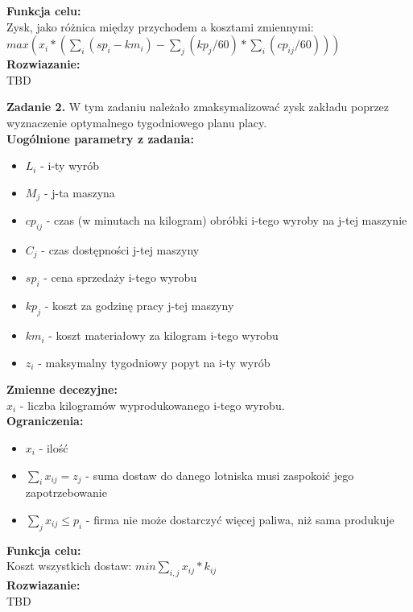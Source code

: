 \documentclass[15pt, a4paper]{article}
\begin{document}
\noindent\textbf{Funkcja celu:}\\

Zysk, jako różnica między przychodem a kosztami zmiennymi:\\ \(max( x_{i} * ( \sum_{i}( sp_i - km_{i} ) - \sum_{j}(kp_j / 60) * \sum_{i}(cp_{ij} / 60)  ))\)\\

\noindent\textbf{Rozwiazanie:}\\ 

TBD

\vspace{0.5cm}

\noindent\hrulefill

\vspace{0.5cm}


\noindent\textbf{Zadanie 2.} W tym zadaniu należało zmaksymalizować zysk zakładu poprzez wyznaczenie optymalnego tygodniowego planu placy.\\

\noindent\textbf{Uogólnione parametry z zadania:}

\begin{itemize}
    \item \( L_i \) - i-ty wyrób
    \item \( M_j \) - j-ta maszyna
    \item \( cp_{ij} \) - czas (w minutach na kilogram) obróbki i-tego wyroby na j-tej maszynie
    \item \( C_j \) - czas dostępności j-tej maszyny
    \item \( sp_i \) - cena sprzedaży i-tego wyrobu
    \item \( kp_j \) - koszt za godzinę pracy j-tej maszyny
    \item \( km_{i} \) - koszt materiałowy za kilogram i-tego wyrobu
    \item \( z_{i} \) - maksymalny tygodniowy popyt na i-ty wyrób
\end{itemize}

\noindent\textbf{Zmienne decezyjne:}\\

\(x_{i}\) - liczba kilogramów wyprodukowanego i-tego wyrobu.\\

\noindent\textbf{Ograniczenia:}

\begin{itemize}
    \item \(x_{i}\) - ilość  
    \item \(\sum_{i}x_{ij} = z_j\)  - suma dostaw do danego lotniska musi zaspokoić jego zapotrzebowanie 
    \item \(\sum_{j}x_{ij} \leq p_i \) - firma nie może dostarczyć więcej paliwa, niż sama produkuje
\end{itemize}

\noindent\textbf{Funkcja celu:}\\

Koszt wszystkich dostaw: \(min \sum_{i, j}x_{ij} * k_{ij} \)\\

\noindent\textbf{Rozwiazanie:}\\ 

TBD
\end{document}
